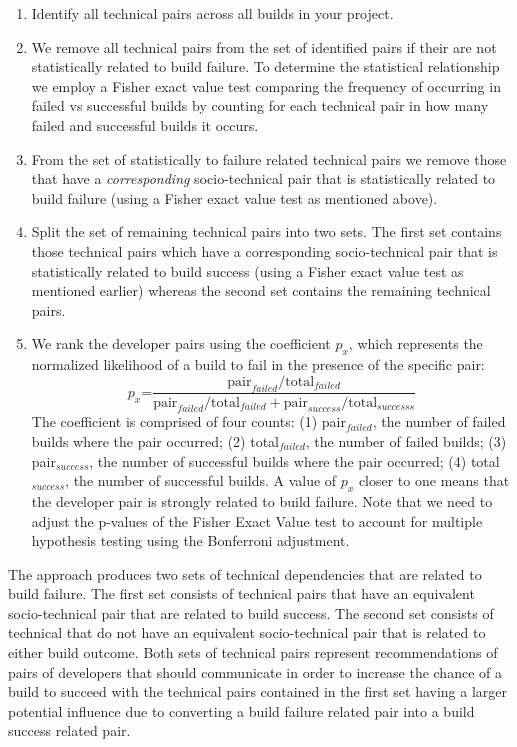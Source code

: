 \documentclass[conference]{IEEEtran}
\begin{document}
\begin{enumerate}
\item Identify all technical pairs across all builds in your project.

\item We remove all technical pairs from the set of identified pairs if their are not statistically related to build failure. To determine the statistical relationship we employ a Fisher exact value test comparing the frequency of occurring in failed vs successful builds by counting for each technical pair in how many failed and successful builds it occurs.

\item From the set of statistically to failure related technical pairs we remove those that have a \emph{corresponding} socio-technical pair that is statistically related to build failure (using a Fisher exact value test as mentioned above).

\item Split the set of remaining technical pairs into two sets.
The first set contains those technical pairs which have a corresponding socio-technical pair that is statistically related to build success (using a Fisher exact value test as mentioned earlier) whereas the second set contains the remaining technical pairs.

\item We rank the developer pairs using the coefficient $p_x$,
which represents the normalized likelihood of a build
to fail in the presence of the specific pair:
$$
p_x\text{=}\frac{ \text{pair}_{failed} / \text{total}_{failed} }
                     { \text{pair}_{failed} / \text{total}_{failed} + \text{pair}_{success} / \text{total}_{successs}}
$$
The coefficient is comprised of four counts: (1) pair$_{failed}$, the number of failed builds where the pair occurred; (2) total$_{failed}$, the number of failed builds; (3) pair$_{success}$, the number of successful builds where the pair occurred; (4) total$_{success}$, the number of successful builds.
A value of $p_x$ closer to one means that the developer pair is strongly related to build
failure. 
Note that we need to adjust the p-values of the Fisher Exact Value test to account for multiple hypothesis testing using the Bonferroni adjustment.
\end{enumerate}

The approach produces two sets of technical dependencies that are related to build failure.
The first set consists of technical pairs that have an equivalent socio-technical pair that are related to build success.
The second set consists of technical that do not have an equivalent socio-technical pair that is related to either build outcome.
Both sets of technical pairs represent recommendations of pairs of developers that should communicate in order to increase the chance of a build to succeed with the technical pairs contained in the first set having a larger potential influence due to converting a build failure related pair into a build success related pair.
\end{document}
